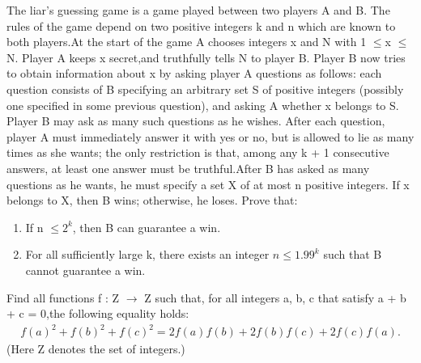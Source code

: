 \item The liar’s guessing game is a game played between two players A and B. The rules of the game depend on two positive integers k and n which are known to both players.At the start of the game A chooses integers x and N with 1 $\leq$x $\leq$ N. Player A keeps x secret,and truthfully tells N to player B. Player B now tries to obtain information about x by asking player A questions as follows: each question consists of B specifying an arbitrary set S of positive integers (possibly one specified in some previous question), and asking A whether x belongs to S. Player B may ask as many such questions as he wishes. After each question, player A must immediately answer it with yes or no, but is allowed to lie as many times as she wants; the only restriction is that, among any k + 1 consecutive answers, at least one answer must be truthful.After B has asked as many questions as he wants, he must specify a set X of at most n positive integers. If x belongs to X, then B wins; otherwise, he loses. Prove that:
\begin{enumerate}
\item If n $\leq 2^k$, then B can guarantee a win.
\item For all sufficiently large k, there exists an integer $n \leq 1.99^k$ such that B cannot guarantee a win.
\end{enumerate}

\item Find all functions f : Z $\rightarrow$ Z such that, for all integers a, b, c that satisfy a + b + c = 0,the following equality holds:
\begin{align*}
f(a)^2 + f(b)^2 + f(c)^2 = 2f(a)f(b) + 2f(b)f(c) + 2f(c)f(a).
\end{align*}
(Here Z denotes the set of integers.)
